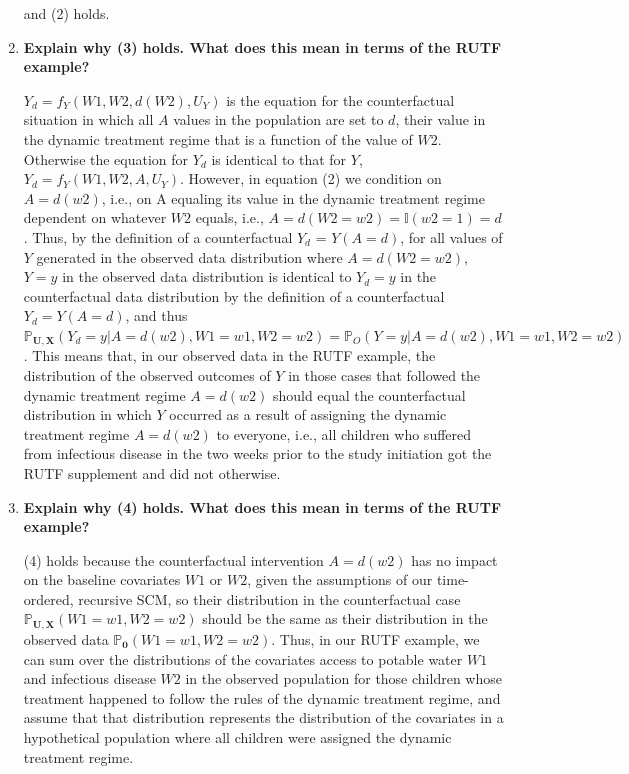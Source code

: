 \documentclass{article}\usepackage[]{graphicx}\usepackage[]{xcolor}
\begin{document}
\begin{enumerate}[label=\textbf{\arabic*.}]
and (2) holds.
  
  \item \textbf{Explain why (3) holds. What does this mean in terms of the RUTF example?}
  
$Y_d = f_Y(W1, W2, d(W2), U_Y)$ is the equation for the counterfactual situation in which all $A$ values in the population are set to $d$, their value in the dynamic treatment regime that is a function of the value of $W2$. Otherwise the equation for $Y_d$ is identical to that for $Y$, $Y_d = f_Y(W1, W2, A, U_Y)$. However, in equation (2) we condition on $A = d(w2)$, i.e., on A equaling its value in the dynamic treatment regime dependent on whatever $W2$ equals, i.e., $A = d(W2 = w2) = \mathbb{I}(w2 = 1) = d$. Thus, by the definition of a counterfactual $Y_d$ = $Y(A = d)$, for all values of $Y$ generated in the observed data distribution where $A = d(W2 = w2)$, $Y = y$ in the observed data distribution is identical to $Y_d = y$ in the counterfactual data distribution by the definition of a counterfactual $Y_d = Y(A = d)$, and thus $\mathbb{P}_{\bm{U},\bm{X}}(Y_d = y | A = d(w2), W1 = w1, W2 = w2) = \mathbb{P}_{O}(Y = y | A = d(w2), W1 = w1, W2 = w2)$. This means that, in our observed data in the RUTF example, the distribution of the observed outcomes of $Y$ in those cases that followed the dynamic treatment regime $A = d(w2)$ should equal the counterfactual distribution in which $Y$ occurred as a result of assigning the dynamic treatment regime $A = d(w2)$ to everyone, i.e., all children who suffered from infectious disease in the two weeks prior to the study initiation got the RUTF supplement and did not otherwise.
  
  \item \textbf{Explain why (4) holds. What does this mean in terms of the RUTF example?}
  
  (4) holds because the counterfactual intervention $A = d(w2)$ has no impact on the baseline covariates $W1$ or $W2$, given the assumptions of our time-ordered, recursive SCM, so their distribution in the counterfactual case $\mathbb{P}_{\bm{U},\bm{X}}(W1 = w1, W2 = w2)$ should be the same as their distribution in the observed data $\mathbb{P}_{\bm{0}}(W1 = w1, W2 = w2)$. Thus, in our RUTF example, we can sum over the distributions of the covariates access to potable water $W1$ and infectious disease $W2$ in the observed population for those children whose treatment happened to follow the rules of the dynamic treatment regime, and assume that that distribution represents the distribution of the covariates in a hypothetical population where all children were assigned the dynamic treatment regime.
  
\end{enumerate}
\end{document}
